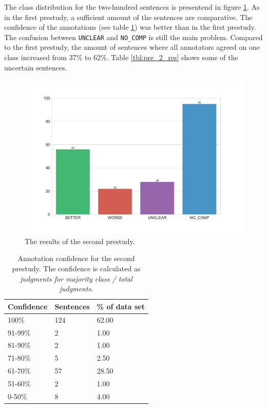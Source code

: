 The class distribution for the two-hundred sentences is presentend in figure \ref{fig:dist_pre_b}.  As in the first prestudy, a sufficient amount of the sentences are comparative. The confidence of the annotations (see table \ref{tbl:pre_b_agg}) was better than in the first prestudy. The confusion between \texttt{UNCLEAR} and \texttt{NO\_COMP} is still the main problem. Compared to the first prestudy, the amount of sentences where all annotators agreed on one class increased from 37\% to 62\%. Table \ref{tbl:pre_2_res} shows some of the uncertain sentences.


\begin{figure}[tb]
\centering
\caption{The results of the second prestudy.}
\label{fig:dist_pre_b}
\includegraphics[width=0.8\linewidth]{images/dataset/preb-dist}
\end{figure}


\begin{table}[tp]
\caption{Annotation confidence for the second prestudy. The confidence is calculated as \emph{judgments for majority class / total judgments}.}
\label{tbl:pre_b_agg}
\begin{tabularx}{\textwidth}{XXX}
\toprule
Confidence & Sentences & \% of data set \\
\midrule
100\%	&	124	&	62.00	 \\ 
91-99\%	&	2	&	1.00	 \\ 
81-90\%	&	2	&	1.00	 \\ 
71-80\%	&	5	&	2.50	 \\ 
61-70\%	&	57	&	28.50	 \\ 
51-60\%	&	2	&	1.00	 \\ 
0-50\%	&	8	&	4.00	 \\ 
\bottomrule
\end{tabularx}
\end{table}




